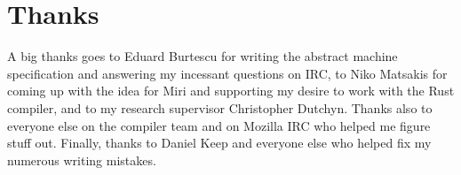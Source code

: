 \documentclass[twocolumn]{article}
\begin{document}

\section{Thanks}

A big thanks goes to Eduard Burtescu for writing the abstract machine specification and answering my
incessant questions on IRC, to Niko Matsakis for coming up with the idea for Miri and supporting my
desire to work with the Rust compiler, and to my research supervisor Christopher Dutchyn. Thanks
also to everyone else on the compiler team and on Mozilla IRC who helped me figure stuff out.
Finally, thanks to Daniel Keep and everyone else who helped fix my numerous writing mistakes.
\end{document}
